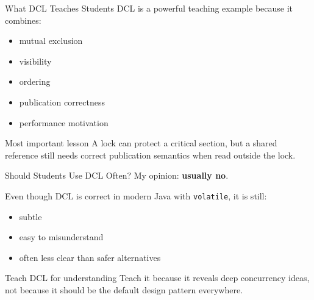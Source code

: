 \documentclass[aspectratio=169,11pt]{beamer}
\begin{document}
	\begin{frame}{What DCL Teaches Students}
		DCL is a powerful teaching example because it combines:
		
		\begin{itemize}
			\item mutual exclusion
			\item visibility
			\item ordering
			\item publication correctness
			\item performance motivation
		\end{itemize}
		
		\vspace{0.35cm}
		
		\begin{alertblock}{Most important lesson}
			A lock can protect a critical section, but a shared reference still needs correct publication semantics when read outside the lock.
		\end{alertblock}
	\end{frame}
	
	\begin{frame}{Should Students Use DCL Often?}
		My opinion: \textbf{usually no}.
		
		\vspace{0.3cm}
		
		Even though DCL is correct in modern Java with \texttt{volatile}, it is still:
		
		\begin{itemize}
			\item subtle
			\item easy to misunderstand
			\item often less clear than safer alternatives
		\end{itemize}
		
		\vspace{0.35cm}
		
		\begin{exampleblock}{Teach DCL for understanding}
			Teach it because it reveals deep concurrency ideas, not because it should be the default design pattern everywhere.
		\end{exampleblock}
	\end{frame}
	
\end{document}
